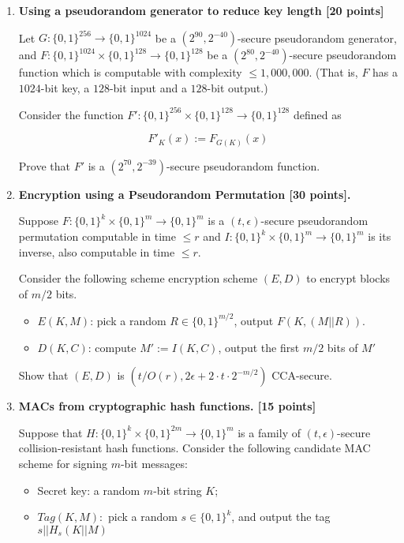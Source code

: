 \documentclass[12pt]{article}
\def\B{\{0,1\}}
\begin{document}
\begin{enumerate}

\item {\bf Using a pseudorandom generator to reduce key length [20 points]}

Let $G : \B^{256} \to \B^{1024}$ be a $(2^{90},2^{-40})$-secure
pseudorandom generator, and $F: \B^{1024} \times \B^{128} \to \B^{128}$
be a $(2^{80},2^{-40})$-secure pseudorandom function which
is computable with complexity $\leq 1,000,000$. (That is,
$F$ has a $1024$-bit key, a $128$-bit input and a $128$-bit output.)

Consider the function $F' : \B^{256} \times \B^{128} \to \B^{128}$
defined as

\[ F'_K(x) := F_{G(K)} (x) \]

Prove that $F'$ is a $(2^{70},2^{-39})$-secure pseudorandom function.

\item {\bf Encryption using a Pseudorandom Permutation [30 points].}

Suppose $F: \B^k \times \B^m \to \B^m$ is a 
$(t,\epsilon)$-secure pseudorandom permutation computable in time $\leq r$
and $I: \B^k \times \B^m \to \B^m$ is its inverse, also computable
in time $\leq r$.

Consider the following scheme encryption scheme
$(E,D)$ to encrypt blocks of $m/2$ bits.

\begin{itemize}

\item $E(K,M)$: pick a random $R\in \B^{m/2}$, output $F(K,(M||R))$.

\item $D(K,C)$: compute $M' := I(K,C)$, output the first $m/2$ bits of $M'$

\end{itemize}

Show that $(E,D)$ is $(t/O(r), 2\epsilon + 2\cdot t \cdot 2^{-m/2})$ CCA-secure.


\item {\bf MACs from cryptographic hash functions. [15 points]}

Suppose that $H: \B^k \times \B^{2m} \to \B^m$ is a family
of $(t,\epsilon)$-secure collision-resistant hash functions.
Consider the following candidate MAC scheme for
signing $m$-bit messages:

\begin{itemize}
\item Secret key: a random $m$-bit string $K$;
\item $Tag(K,M):$ pick a random $s\in \B^k$, and output
the tag $s || H_s (K||M)$


\end{itemize}
\end{enumerate}
\end{document}
